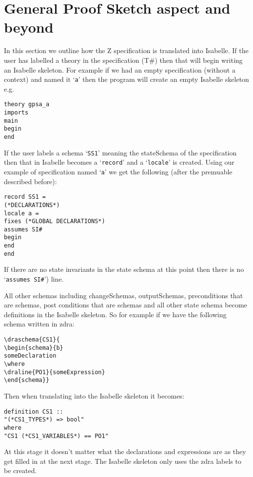 \chapter{General Proof Sketch aspect and beyond}
\label{chap:gpsa2isa}

 In this section we outline how the Z specification is
translated into Isabelle. If the user has labelled a theory in the specification (T\#) then that will
begin writing an Isabelle skeleton.
For example if we had an empty specification (without a context) and named it `\texttt{a}' then the program
will create an empty Isabelle skeleton e.g.

\begin{verbatim}
theory gpsa_a
imports
main
begin
end
\end{verbatim}

If the user labels a schema `\texttt{SS1}' meaning the stateSchema of the
specification then that in Isabelle becomes a `\texttt{record}' and a
`\texttt{locale}' is created. Using our example of specification named
`\texttt{a}' we get the following (after the premuable described before):
\begin{verbatim}
record SS1 =
(*DECLARATIONS*)
locale a =
fixes (*GLOBAL DECLARATIONS*)
assumes SI#
begin
end
end
\end{verbatim}

If there are no state invariants in the state schema at this point then there is
no `\texttt{assumes SI\#}') line.

All other schemas including changeSchemas, outputSchemas, preconditions that are
schemas, post conditions that are schemas and all other state schema become
definitions in the Isabelle skeleton. So for example if we have the following
schema written in \gls{zdra}:
\begin{verbatim}
\draschema{CS1}{
\begin{schema}{b}
someDeclaration
\where
\draline{PO1}{someExpression}
\end{schema}}
\end{verbatim}

Then when translating into the Isabelle skeleton it becomes:
\begin{verbatim}
definition CS1 ::
"(*CS1_TYPES*) => bool"
where
"CS1 (*CS1_VARIABLES*) == PO1"
\end{verbatim}

At this stage it doesn't matter what the declarations and expressions are as
they get filled in at the next stage. The Isabelle skeleton only uses the
\gls{zdra} labels to be created.

